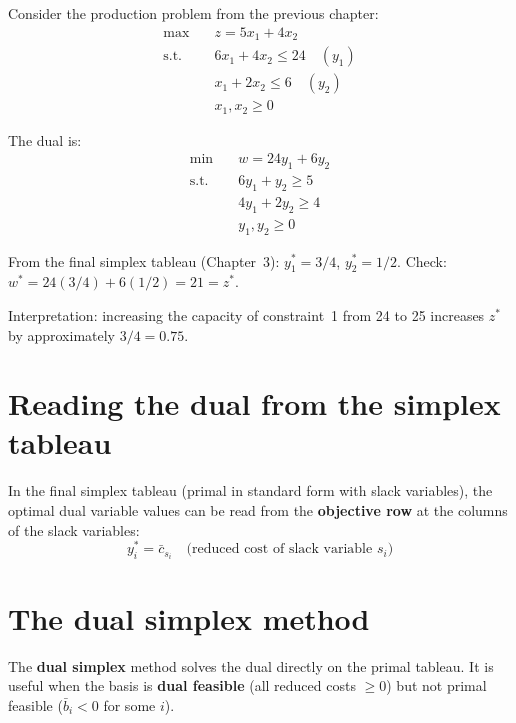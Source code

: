 \begin{example}
Consider the production problem from the previous chapter:
\[
\begin{aligned}
  \max \quad & z = 5x_1 + 4x_2 \\
  \text{s.t.} \quad
    & 6x_1 + 4x_2 \le 24 \quad (y_1) \\
    & x_1 + 2x_2 \le 6 \quad (y_2) \\
    & x_1, x_2 \ge 0
\end{aligned}
\]

The dual is:
\[
\begin{aligned}
  \min \quad & w = 24y_1 + 6y_2 \\
  \text{s.t.} \quad
    & 6y_1 + y_2 \ge 5 \\
    & 4y_1 + 2y_2 \ge 4 \\
    & y_1, y_2 \ge 0
\end{aligned}
\]

From the final simplex tableau (Chapter~3):
$y_1^* = 3/4$, $y_2^* = 1/2$.  Check: $w^* = 24(3/4) + 6(1/2) = 21 = z^*$.

Interpretation: increasing the capacity of constraint~1 from 24 to 25
increases $z^*$ by approximately $3/4 = 0.75$.
\end{example}

\section{Reading the dual from the simplex tableau}

\begin{proposition}
In the final simplex tableau (primal in standard form with slack variables),
the optimal dual variable values can be read from the \textbf{objective row}
at the columns of the slack variables:
\[
  y_i^* = \bar{c}_{s_i} \quad \text{(reduced cost of slack variable $s_i$)}
\]
\end{proposition}

\section{The dual simplex method}

The \textbf{dual simplex} method solves the dual directly on the primal
tableau.  It is useful when the basis is \textbf{dual feasible} (all
reduced costs $\ge 0$) but not primal feasible ($\bar{b}_i < 0$ for some
$i$).

